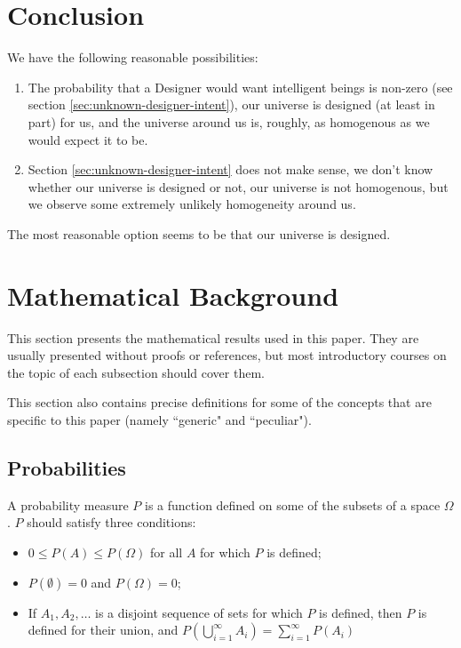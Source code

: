 \documentclass[a4paper
,draft
]{article}
\newcommand{\ghilimele}[1]{``#1"}
\begin{document}
\section{Conclusion}
\label{sec:conclusion}

We have the following reasonable possibilities:

\begin{enumerate}
\item The probability that a Designer would want intelligent beings
      is non-zero (see section \ref{sec:unknown-designer-intent}),
      our universe is designed (at least in part) for us,
      and the universe around us is, roughly, as homogenous as we would
      expect it to be.
\item Section \ref{sec:unknown-designer-intent} does not make sense,
      we don't know whether our universe is designed or not,
      our universe is not homogenous, but we observe some
      extremely unlikely homogeneity around us.
\end{enumerate}

The most reasonable option seems to be that our universe is designed.

\section{Mathematical Background}
\label{sec:background}

This section presents the mathematical results used in this paper. They are
usually presented without proofs or references, but most introductory courses
on the topic of each subsection should cover them.

This section also contains precise definitions for some of the concepts that
are specific to this paper
(namely \ghilimele{generic} and \ghilimele{peculiar}).

\subsection{Probabilities}
\label{sec:probabilities}

A probability measure $P$ is a function defined on some of the subsets of a
space $\Omega$. $P$ should satisfy three conditions:
\begin{itemize}
  \item $0 \le P(A) \le P(\Omega)$ for all $A$ for which $P$ is defined;
  \item $P(\emptyset) = 0$ and $P(\Omega) = 0$;
  \item If $A_1, A_2, \dots$ is a disjoint sequence of sets for which $P$ is
        defined, then $P$ is defined for their union, and
        $P(\bigcup\limits_{i=1}^{\infty} A_i)=\sum_{i=1}^{\infty}P(A_i)$
\end{itemize}
\end{document}
